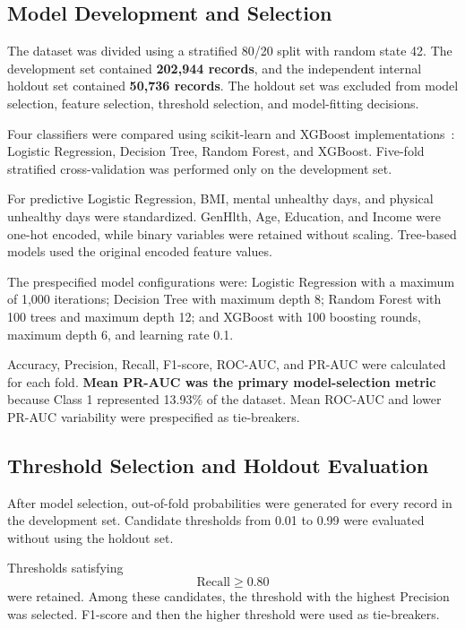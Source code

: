 \documentclass[pdflatex,sn-basic,Numbered]{sn-jnl}
\begin{document}
\subsection{Model Development and Selection}
\label{subsec:ml}

The dataset was divided using a stratified 80/20 split with random state
42.
The development set contained \textbf{202,944 records}, and the independent
internal holdout set contained \textbf{50,736 records}.
The holdout set was excluded from model selection, feature selection,
threshold selection, and model-fitting decisions.

Four classifiers were compared using scikit-learn and XGBoost implementations~\citep{pedregosa2011scikit,chen2016xgboost}:
Logistic Regression, Decision Tree, Random Forest, and XGBoost.
Five-fold stratified cross-validation was performed only on the development
set.

For predictive Logistic Regression, BMI, mental unhealthy days, and
physical unhealthy days were standardized.
GenHlth, Age, Education, and Income were one-hot encoded, while binary
variables were retained without scaling.
Tree-based models used the original encoded feature values.

The prespecified model configurations were:
Logistic Regression with a maximum of 1,000 iterations;
Decision Tree with maximum depth 8;
Random Forest with 100 trees and maximum depth 12; and
XGBoost with 100 boosting rounds, maximum depth 6, and learning rate 0.1.

Accuracy, Precision, Recall, F1-score, ROC-AUC, and PR-AUC were calculated
for each fold.
\textbf{Mean PR-AUC was the primary model-selection metric} because Class 1
represented 13.93\% of the dataset.
Mean ROC-AUC and lower PR-AUC variability were prespecified as tie-breakers.


\subsection{Threshold Selection and Holdout Evaluation}
\label{subsec:threshold}

After model selection, out-of-fold probabilities were generated for every
record in the development set.
Candidate thresholds from 0.01 to 0.99 were evaluated without using the
holdout set.

Thresholds satisfying
\[
\mathrm{Recall} \geq 0.80
\]
were retained.
Among these candidates, the threshold with the highest Precision was
selected.
F1-score and then the higher threshold were used as tie-breakers.
\end{document}
